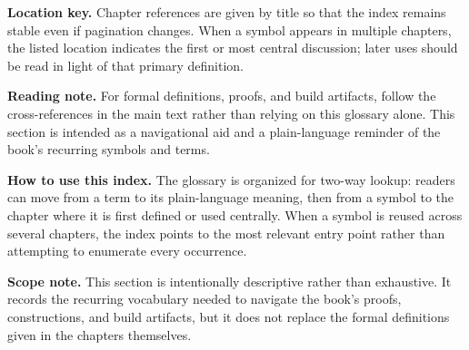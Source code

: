 \documentclass[11pt]{article}
\begin{document}
\medskip

\noindent\textbf{Location key.} Chapter references are given by title so that the index remains stable even if pagination changes. When a symbol appears in multiple chapters, the listed location indicates the first or most central discussion; later uses should be read in light of that primary definition.

\medskip

\noindent\textbf{Reading note.} For formal definitions, proofs, and build artifacts, follow the cross-references in the main text rather than relying on this glossary alone. This section is intended as a navigational aid and a plain-language reminder of the book's recurring symbols and terms.

\medskip

\noindent\textbf{How to use this index.} The glossary is organized for two-way lookup: readers can move from a term to its plain-language meaning, then from a symbol to the chapter where it is first defined or used centrally. When a symbol is reused across several chapters, the index points to the most relevant entry point rather than attempting to enumerate every occurrence.

\medskip

\noindent\textbf{Scope note.} This section is intentionally descriptive rather than exhaustive. It records the recurring vocabulary needed to navigate the book's proofs, constructions, and build artifacts, but it does not replace the formal definitions given in the chapters themselves.
\end{document}
